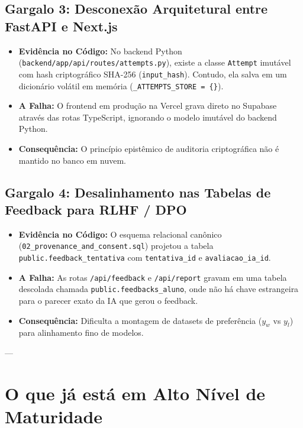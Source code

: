 \documentclass[11pt,a4paper]{article}
\begin{document}
\subsection{Gargalo 3: Desconexão Arquitetural entre FastAPI e Next.js}
\begin{itemize}[leftmargin=*]
    \item \textbf{Evidência no Código:} No backend Python (\texttt{backend/app/api/routes/attempts.py}), existe a classe \texttt{Attempt} imutável com hash criptográfico SHA-256 (\texttt{input\_hash}). Contudo, ela salva em um dicionário volátil em memória (\texttt{\_ATTEMPTS\_STORE = \{\}}).
    \item \textbf{A Falha:} O frontend em produção na Vercel grava direto no Supabase através das rotas TypeScript, ignorando o modelo imutável do backend Python.
    \item \textbf{Consequência:} O princípio epistêmico de auditoria criptográfica não é mantido no banco em nuvem.
\end{itemize}

\subsection{Gargalo 4: Desalinhamento nas Tabelas de Feedback para RLHF / DPO}
\begin{itemize}[leftmargin=*]
    \item \textbf{Evidência no Código:} O esquema relacional canônico (\texttt{02\_provenance\_and\_consent.sql}) projetou a tabela \texttt{public.feedback\_tentativa} com \texttt{tentativa\_id} e \texttt{avaliacao\_ia\_id}.
    \item \textbf{A Falha:} As rotas \texttt{/api/feedback} e \texttt{/api/report} gravam em uma tabela descolada chamada \texttt{public.feedbacks\_aluno}, onde não há chave estrangeira para o parecer exato da IA que gerou o feedback.
    \item \textbf{Consequência:} Dificulta a montagem de datasets de preferência ($y_w$ vs $y_l$) para alinhamento fino de modelos.
\end{itemize}

---

\section{O que já está em Alto Nível de Maturidade}
\end{document}
